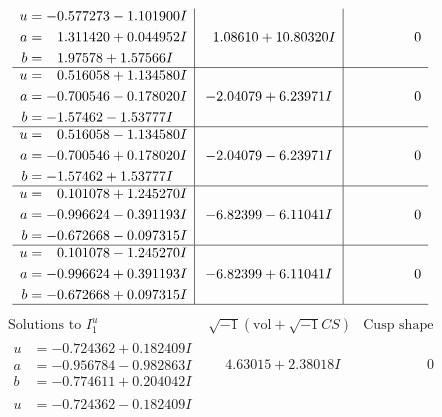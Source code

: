 \documentclass[1p]{elsarticle_modified}
\theoremstyle{definition}
\newcommand{\I}{\sqrt{-1}}
\begin{document}
$$\begin{array}{c|c|c}
\begin{aligned}
u &= -0.577273 - 1.101900 I \\
a &= \phantom{-}1.311420 + 0.044952 I \\
b &= \phantom{-}1.97578 + 1.57566 I\end{aligned}
 & \phantom{-}1.08610 + 10.80320 I & \phantom{-0.000000 } 0 \\ \hline\begin{aligned}
u &= \phantom{-}0.516058 + 1.134580 I \\
a &= -0.700546 - 0.178020 I \\
b &= -1.57462 - 1.53777 I\end{aligned}
 & -2.04079 + 6.23971 I & \phantom{-0.000000 } 0 \\ \hline\begin{aligned}
u &= \phantom{-}0.516058 - 1.134580 I \\
a &= -0.700546 + 0.178020 I \\
b &= -1.57462 + 1.53777 I\end{aligned}
 & -2.04079 - 6.23971 I & \phantom{-0.000000 } 0 \\ \hline\begin{aligned}
u &= \phantom{-}0.101078 + 1.245270 I \\
a &= -0.996624 - 0.391193 I \\
b &= -0.672668 - 0.097315 I\end{aligned}
 & -6.82399 - 6.11041 I & \phantom{-0.000000 } 0 \\ \hline\begin{aligned}
u &= \phantom{-}0.101078 - 1.245270 I \\
a &= -0.996624 + 0.391193 I \\
b &= -0.672668 + 0.097315 I\end{aligned}
 & -6.82399 + 6.11041 I & \phantom{-0.000000 } 0\\
 \hline 
 \end{array}$$\newpage$$\begin{array}{c|c|c}  
\text{Solutions to }I^u_{1}& \I (\text{vol} + \sqrt{-1}CS) & \text{Cusp shape}\\
 \hline 
\begin{aligned}
u &= -0.724362 + 0.182409 I \\
a &= -0.956784 - 0.982863 I \\
b &= -0.774611 + 0.204042 I\end{aligned}
 & \phantom{-}4.63015 + 2.38018 I & \phantom{-0.000000 } 0 \\ \hline\begin{aligned}
u &= -0.724362 - 0.182409 I \\

\end{aligned}
\end{array}$$
\end{document}
